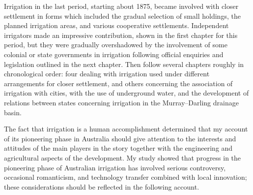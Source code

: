 Irrigation in the last period, starting about 1875, became involved
with closer settlement in forms which included the gradual selection
of small holdings, the planned irrigation areas, and various
cooperative settlements.  Independent irrigators made an impressive
contribution, shown in the first chapter for this period, but they
were gradually overshadowed by the involvement of some colonial or
state governments in irrigation following official enquiries and
legislation outlined in the next chapter.  Then follow several
chapters roughly in chronological order: four dealing with irrigation
used under different arrangements for closer settlement, and others
concerning the association of irrigation with cities, with the use of
underground water, and the development of relations between states
concerning irrigation in the Murray--Darling drainage basin.

The fact that irrigation is a human accomplishment determined that my
account of its pioneering phase in Australia should give attention to
the interests and attitudes of the main players in the story together
with the engineering and agricultural aspects of the development.  My
study showed that progress in the pioneering phase of Australian
irrigation has involved serious controversy, occasional romanticism,
and technology transfer combined with local innovation; these
considerations should be reflected in the following account.


\theendnotes
